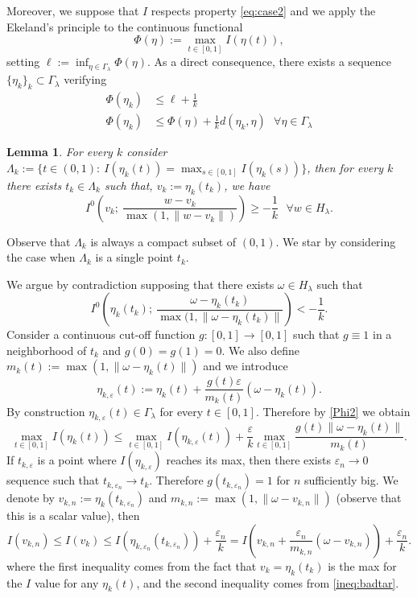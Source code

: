 \documentclass[11pt]{amsart}
\numberwithin{equation}{section} %
\newtheorem{lemma}[teo]{Lemma}
\theoremstyle{definition}
\begin{document}
Moreover, we suppose that $I$ respects property \eqref{eq:case2}
and we apply the Ekeland's principle to the continuous functional 
\[
\Phi(\eta):=\max_{t\in[0,1]}I(\eta(t)),
\]
setting $ \ell:=\inf_{\eta\in \Gamma_\lambda}\Phi(\eta)$.
As a direct consequence, there exists
a sequence $\{\eta_k\}_k\subset \Gamma_\lambda$
verifying
\begin{align}
	\Phi(\eta_k)&\leq \ell+\frac{1}{k}\label{Phi1}\\
	\Phi(\eta_k)&\leq \Phi(\eta)+\frac{1}{k}d(\eta_k,\eta)\ \ \ \forall\eta\in \Gamma_\lambda\label{Phi2}
\end{align}
\begin{lemma}\label{lem:appe}
	For every $k$ consider $\Lambda_k:=\{t\in (0,1):\ I(\eta_k(t))=\max_{s\in[0,1]}I(\eta_k(s))\}$,
	then for every $k$ there exists $t_k\in \Lambda_k$ such that, $v_k:=\eta_k(t_k)$,
	we have
	\begin{equation}\label{eq:gddeta}
		I^0\left(v_k;\ \frac{w-v_k}{\max(1, \|w-v_k\|)}\right)\geq-\frac{1}{k}\ \ \ \forall w\in H_\lambda.
	\end{equation}
\end{lemma}
\proof
Observe that $\Lambda_k$ is always a compact subset of $(0,1)$.
We star by considering the case when $\Lambda_k$ is a single point $t_k$.

We argue by contradiction supposing that there exists $\omega\in H_\lambda$
such that 
\begin{equation}\label{assumption}
	I^0\left(\eta_k(t_k);\ \frac{\omega-\eta_k(t_k)}{\max(1,\|\omega-\eta_k(t_k)\|}\right)<-\frac{1}{k}.
\end{equation}
Consider a continuous cut-off function $g\colon[0,1]\to [0,1]$ such that $g\equiv 1$ in a neighborhood
of $t_k$ and $g(0)=g(1)=0$. We also define $m_k(t):=\max(1,\|\omega-\eta_k(t)\|)$
and we introduce
\[
\eta_{k,\varepsilon}(t):=\eta_k(t)+\frac{g(t)\varepsilon}{m_k(t)}(\omega-\eta_k(t)).
\]
By construction $\eta_{k,\varepsilon}(t)\in \Gamma_\lambda$ for every $t\in [0,1]$.
Therefore by \eqref{Phi2} we obtain
\begin{equation}\label{ineq:badtar}
	\max_{t\in [0,1]} I(\eta_k(t))\leq \max_{t\in [0,1]}I(\eta_{k,\varepsilon}(t))+\frac{\varepsilon}{k} \max_{t\in[0,1]}\frac{g(t)\|\omega-\eta_k(t)\|}{m_k(t)}.
\end{equation}
If $t_{k,\varepsilon}$ is a point where $I(\eta_{k,\varepsilon})$ reaches its max,
then there exists $\varepsilon_n\to0$ sequence such that $t_{k,\varepsilon_n}\to t_k$.
Therefore $g(t_{k,\varepsilon_n})=1$ for $n$ sufficiently big. We denote by $v_{k,n}:=\eta_k(t_{k,\varepsilon_n})$
and $m_{k,n}:=\max(1,\|\omega-v_{k,n}\|)$ (observe that this is a scalar value),
then
\begin{equation}\label{ineq:badtar2}
	I(v_{k,n})\leq I(v_k)\leq I(\eta_{k,\varepsilon_n}(t_{k,\varepsilon_n}))+\frac{\varepsilon_n}{k}
	=I\left(v_{k,n}+\frac{\varepsilon_n}{m_{k,n}}(\omega-v_{k,n})\right)+\frac{\varepsilon_n}{k}.
\end{equation}
where the first inequality comes from the fact that $v_k=\eta_k(t_k)$
is the max for the $I$ value for any $\eta_k(t)$,
and the second inequality comes from \eqref{ineq:badtar}.\newline
\end{document}
